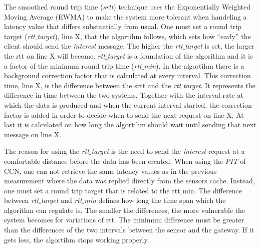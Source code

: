 The smoothed round trip time (\textit{srtt}) technique uses the Exponentially Weighted Moving Average (EWMA) to make the system more tolerant when handeling a latency value that differs substantially from usual. One must set a round trip target (\textit{rtt$\_$target}), line X, that the algortihm follows, which sets how ``early'' the client should send the \textit{interest} message. The higher the \textit{rtt$\_$target} is set, the larger the rtt on line X will become. \textit{rtt$\_$target} is a foundation of the algorithm and it is a factor of the minimum round trip time (\textit{rtt$\_$min}). In the algortihm there is a background correction factor that is calculated at every interval. This correction time, line X, is the difference between the srtt and the \textit{rtt$\_$target}. It represents the difference in time between the two systems. Together with the interval rate at which the data is produced and when the current interval started, the correction factor is added in order to decide when to send the next request on line X. At last it is calculated on how long the algortihm should wait until sending that next message on line X.

The reason for using the \textit{rtt$\_$target} is the need to send the \textit{interest} request at a comfortable distance before the data has been created.
When using the \textit{PIT} of CCN, one can not retrieve the same latency values as in the previous measurement where the data was replied directly from the sensors cache. Instead, one must set a round trip target that is related to the rtt$\_$min. The difference between \textit{rtt$\_$target} and \textit{rtt$\_$min} defines how long the time span which the algorithm can regulate is. The smaller the differences, the more vulnerable the system becomes for variations of rtt. The minimum difference must be greater than the differences of the two intervals between the sensor and the gateway. If it gets less, the algortihm stops working properly.

